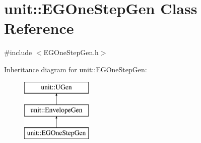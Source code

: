 \hypertarget{classunit_1_1EGOneStepGen}{}\section{unit\+:\+:E\+G\+One\+Step\+Gen Class Reference}
\label{classunit_1_1EGOneStepGen}


{\ttfamily \#include $<$E\+G\+One\+Step\+Gen.\+h$>$}

Inheritance diagram for unit\+:\+:E\+G\+One\+Step\+Gen\+:\begin{figure}[H]
\begin{center}
\leavevmode
\includegraphics[height=3.000000cm]{classunit_1_1EGOneStepGen}
\end{center}
\end{figure}
